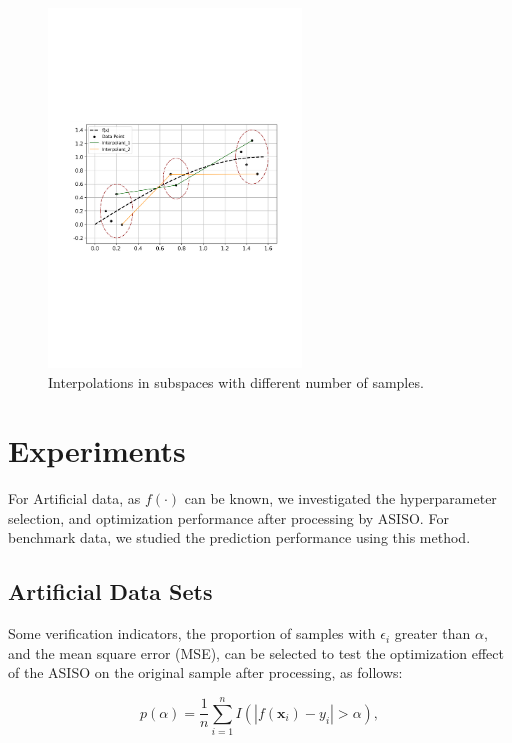 \documentclass[sn-mathphys,Numbered]{sn-jnl}%
\theoremstyle{thmstyleone}%
\theoremstyle{thmstyletwo}%
\theoremstyle{thmstylethree}%
\begin{document}
\begin{figure}[H]%
\centering
\vspace{-3.9cm}   %
\setlength{\abovecaptionskip}{0.cm} %
\setlength{\abovecaptionskip}{-3.4cm} %
\includegraphics[width=0.6\textwidth]{fig3.pdf}
\caption{Interpolations in subspaces with different number of samples.}\label{fig3}
\end{figure}

\section{Experiments}\label{sec4}

For Artificial data, as $f(\cdot)$ can be known, we investigated the hyperparameter selection, and optimization performance after processing by ASISO. For benchmark data, we studied the prediction performance using this method.

\subsection{Artificial Data Sets}\label{subsec1}

Some verification indicators, the proportion of samples with $\epsilon_i$ greater than $\alpha$, and the mean square error (MSE), can be selected to test the optimization effect of the ASISO on the original sample after processing, as follows:

\begin{equation}
p(\alpha)=\dfrac{1}{n}\sum\limits_{i=1}^nI(|f(\boldsymbol{x}_i)-y_i|>\alpha),\label{eq13}
\end{equation}
\end{document}
